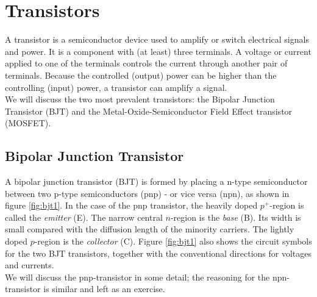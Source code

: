\chapter{Transistors}

A transistor is a semiconductor device used to amplify or switch electrical signals and power.  It is a component with (at least) three terminals. A voltage or current applied to one of the  terminals controls the current through another pair of terminals. Because the controlled (output) power can be higher than the controlling (input) power, a transistor can amplify a signal.\\
We will discuss the two most prevalent transistors: the Bipolar Junction Transistor (BJT) and the Metal-Oxide-Semiconductor Field Effect transistor (MOSFET).
\section{Bipolar Junction Transistor}
\label{sec:bipolar_junction}
A bipolar junction transistor (BJT) is formed by placing a n-type semiconductor between two p-type semiconductors (pnp) - or vice versa (npn), as shown in figure \ref{fig:bjt1}. In the case of the pnp transistor, the heavily doped $p^+$-region is called the \emph{emitter} (E). The narrow central $n$-region is the \emph{base} (B). Its width is small compared with the diffusion length of the minority carriers. The lightly doped $p$-region is the \emph{collector} (C). Figure \ref{fig:bjt1} also shows the circuit symbols for the two BJT transistors, together with the conventional directions for voltages and currents.\\
We will discuss the pnp-transistor in some detail; the reasoning for the npn-transistor is similar and left as an exercise.

